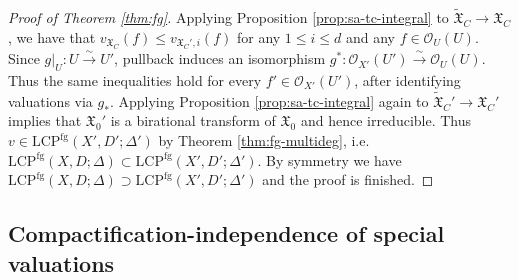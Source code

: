 \documentclass[reqno, 12pt]{amsart}
\theoremstyle{definition}
\newcommand{\cO}{\mathcal{O}}
\newcommand{\fX}{\mathfrak{X}}
\newcommand{\rfg}{\mathrm{fg}}
\newcommand{\LCP}{\mathrm{LCP}}
\newcommand{\tfX}{\widetilde{\mathfrak{X}}}
\numberwithin{equation}{section}
\begin{document}
\begin{proof}[Proof of Theorem \ref{thm:fg}]
Applying Proposition \ref{prop:sa-tc-integral} to $\tfX_C\to \fX_C$, we have that $v_{\fX_C}(f) \leq v_{\fX_C', i} (f)$ for any $1\leq i\leq d$ and any $f\in \cO_U(U)$.
Since $g|_U:U\xrightarrow{\sim}U'$, pullback induces an isomorphism
$g^*:\cO_{X'}(U')\xrightarrow{\sim}\cO_U(U)$.
Thus the same inequalities hold for every
$f'\in\cO_{X'}(U')$, after identifying valuations via $g_*$.
Applying Proposition \ref{prop:sa-tc-integral} again to $\tfX_C'\to \fX_C'$ implies that $\fX_0'$ is a birational transform of $\fX_0$ and hence irreducible. Thus $v\in\LCP^{\rfg}(X',D';\Delta')$ by Theorem \ref{thm:fg-multideg}, i.e.\ $\LCP^{\rfg}(X,D;\Delta)\subset \LCP^{\rfg}(X',D';\Delta')$. By symmetry we have $\LCP^{\rfg}(X,D;\Delta)\supset \LCP^{\rfg}(X',D';\Delta')$ and the proof is finished.
\end{proof}


\subsection{Compactification-independence of special valuations}
\end{document}
